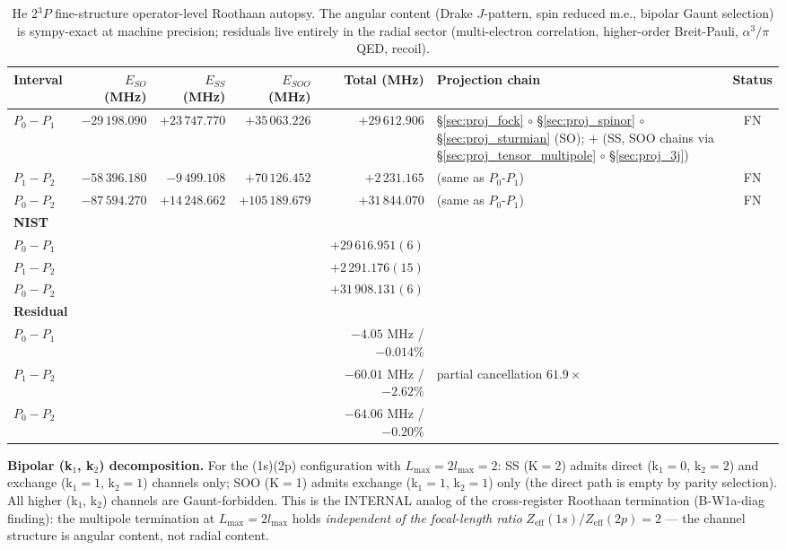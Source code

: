 \documentclass[11pt]{article}
\begin{document}
\begin{table}[h]
\centering\small
\begin{tabular}{p{2.6cm} r r r r p{4.5cm} c}
\toprule
Interval & $E_{SO}$ (MHz) & $E_{SS}$ (MHz) & $E_{SOO}$ (MHz) & Total (MHz) & Projection chain & Status \\
\midrule
$P_0 - P_1$ & $-29\,198.090$ & $+23\,747.770$ & $+35\,063.226$ & $+29\,612.906$ &
\S\ref{sec:proj_fock} $\circ$ \S\ref{sec:proj_spinor} $\circ$
\S\ref{sec:proj_sturmian} (SO); $+$ (SS, SOO chains via
\S\ref{sec:proj_tensor_multipole} $\circ$ \S\ref{sec:proj_3j}) & FN \\
$P_1 - P_2$ & $-58\,396.180$ & $-9\,499.108$ & $+70\,126.452$ & $+2\,231.165$ &
(same as $P_0$-$P_1$) & FN \\
$P_0 - P_2$ & $-87\,594.270$ & $+14\,248.662$ & $+105\,189.679$ & $+31\,844.070$ &
(same as $P_0$-$P_1$) & FN \\
\midrule
\textbf{NIST} & & & & & & \\
$P_0 - P_1$ & & & & $+29\,616.951(6)$ & & \\
$P_1 - P_2$ & & & & $+2\,291.176(15)$ & & \\
$P_0 - P_2$ & & & & $+31\,908.131(6)$ & & \\
\midrule
\textbf{Residual} & & & & & & \\
$P_0 - P_1$ & & & & $-4.05$ MHz / $-0.014\%$ & & \\
$P_1 - P_2$ & & & & $-60.01$ MHz / $-2.62\%$ & partial cancellation $61.9\times$ & \\
$P_0 - P_2$ & & & & $-64.06$ MHz / $-0.20\%$ & & \\
\bottomrule
\end{tabular}
\caption{He $2{}^3P$ fine-structure operator-level Roothaan autopsy.
The angular content (Drake $J$-pattern, spin reduced m.e., bipolar
Gaunt selection) is sympy-exact at machine precision; residuals live
entirely in the radial sector (multi-electron correlation, higher-order
Breit-Pauli, $\alpha^3/\pi$ QED, recoil).}
\label{tab:autopsy_he_2_3p}
\end{table}

\textbf{Bipolar (k$_1$, k$_2$) decomposition.}
For the (1s)(2p) configuration with $L_\text{max} = 2 l_\text{max} = 2$:
SS (K$=$2) admits direct (k$_1=0$, k$_2=2$) and exchange (k$_1=1$, k$_2=1$)
channels only; SOO (K$=$1) admits exchange (k$_1=1$, k$_2=1$) only (the
direct path is empty by parity selection).  All higher (k$_1$, k$_2$)
channels are Gaunt-forbidden.  This is the INTERNAL analog of the
cross-register Roothaan termination (B-W1a-diag finding): the
multipole termination at $L_\text{max} = 2 l_\text{max}$ holds
\emph{independent of the focal-length ratio} $Z_\text{eff}(1s) /
Z_\text{eff}(2p) = 2$ --- the channel structure is angular content,
not radial content.
\end{document}
